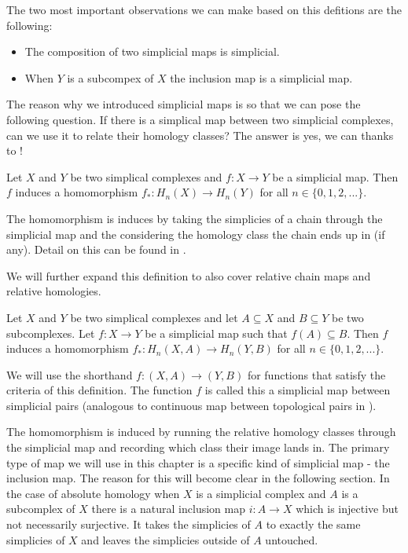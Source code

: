 The two most important observations we can make based on this defitions are the following:

\begin{itemize}
    \item The composition of two simplicial maps is simplicial.
    \item When $Y$ is a subcompex of $X$ the inclusion map is a simplicial map.
\end{itemize}


The reason why we introduced simplicial maps is so that we can pose the following question. If there is a simplical map between two simplicial complexes, can we use it to relate their homology classes? The answer is yes, we can thanks to \cite{combinatorial-algebraic-topology}!



\begin{defn} Let $X$ and $Y$ be two simplical complexes and $f: X \to Y$ be a simplicial map. Then $f$ induces a homomorphism $f_*: H_n(X) \to H_n(Y)$ for all $n \in \{0, 1, 2, ...\}$. \end{defn}

The homomorphism is induces by taking the simplicies of a chain through the simplicial map and the considering the homology class the chain ends up in (if any). Detail on this can be found in \cite{combinatorial-algebraic-topology}.

We will further expand this definition to also cover relative chain maps and relative homologies.

\begin{defn} Let $X$ and $Y$ be two simplical complexes and let $A \subseteq X$ and $B \subseteq Y$ be two subcomplexes. Let $f: X \to Y$ be a simplicial map such that $f(A) \subseteq B$. Then $f$ induces a homomorphism $f_*: H_n(X, A) \to H_n(Y, B)$ for all $n \in \{0, 1, 2, ...\}$. \end{defn}

We will use the shorthand $f: (X, A) \to (Y, B)$ for functions that satisfy the criteria of this definition. The function $f$ is called this a simplicial map between simplicial pairs (analogous to continuous map between topological pairs in \cite{algebraic-topology}).


The homomorphism is induced by running the relative homology classes through the simplicial map and recording which class their image lands in. The primary type of map we will use in this chapter is a specific kind of simplicial map - the inclusion map. The reason for this will become clear in the following section. In the case of absolute homology when $X$ is a simplicial complex and $A$ is a subcomplex of $X$ there is a natural inclusion map $i: A \to X$ which is injective but not necessarily surjective. It takes the simplicies of $A$ to exactly the same simplicies of $X$ and leaves the simplicies outside of $A$ untouched.

